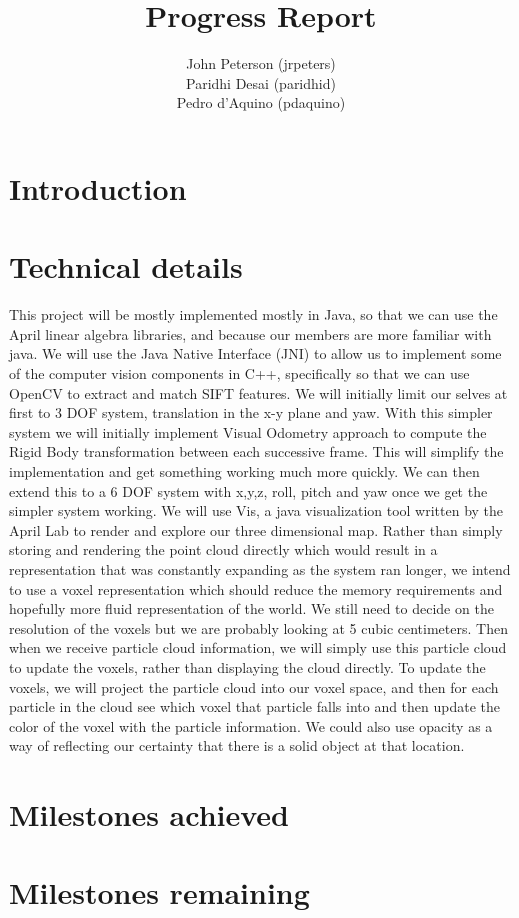 \documentclass[12pt]{article}
\title{Progress Report}
\author{
	John Peterson (jrpeters)\\
	Paridhi Desai (paridhid)\\
	Pedro d'Aquino (pdaquino)}
\begin{document}
\maketitle

\section{Introduction}

\section{Technical details}
This project will be mostly implemented mostly in Java, so that we can use the April linear algebra libraries, and because our members are more familiar with java.  We will use the Java Native Interface (JNI) to allow us to implement some of the computer vision components in C++, specifically so that we can use OpenCV to extract and match SIFT features.  
	We will initially limit our selves at first to 3 DOF system, translation in the x-y plane and yaw.  With this simpler system we will initially implement Visual Odometry approach to compute the Rigid Body transformation between each successive frame. This will simplify the implementation and get something working much more quickly.   We can then extend this to a 6 DOF system with x,y,z, roll, pitch and yaw once we get the simpler system working.  
We will use Vis, a java visualization tool written by the April Lab to render and explore our three dimensional map.   Rather than simply storing and rendering the point cloud directly which would result in a representation that was constantly expanding as the system ran longer, we intend to use a voxel representation which should reduce the memory requirements and hopefully more fluid representation of the world.  We still need to decide on the resolution of the voxels but we are probably looking at 5 cubic centimeters.  Then when we receive particle cloud information, we will simply use this particle cloud to update the voxels, rather than displaying the cloud directly.   To update the voxels, we will project the particle cloud into our voxel space, and then for each particle in the cloud see which voxel that particle falls into and then update the color of the voxel with the particle information.  We could also use opacity as a way of reflecting our certainty that there is a solid object at that location. 


\section{Milestones achieved}

\section{Milestones remaining}
\end{document}
